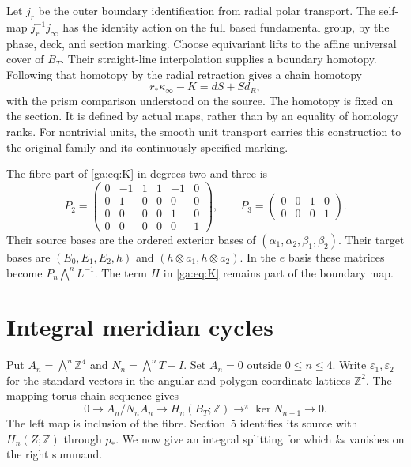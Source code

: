 Let $j_r$ be the outer boundary identification from radial polar transport.
The self-map $j_r^{-1}j_\infty$ has the identity action on the full
based fundamental group, by the phase, deck, and section marking.
Choose equivariant lifts to the affine universal cover of $B_T$.
Their straight-line interpolation supplies a boundary homotopy.
Following that homotopy by the radial retraction gives a chain homotopy
\begin{equation}\label{ga:eq:comparison}
r_*\kappa_\infty-K=dS+Sd_R,
\end{equation}
with the prism comparison understood on the source.
The homotopy is fixed on the section.
It is defined by actual maps, rather than by an equality of homology ranks.
For nontrivial units, the smooth unit transport carries this construction
to the original family and its continuously specified marking.

The fibre part of \eqref{ga:eq:K} in degrees two and three is
\begin{equation}\label{ga:eq:p23}
P_2=\begin{pmatrix}
0&-1&1&1&-1&0\\0&1&0&0&0&0\\0&0&0&0&1&0\\0&0&0&0&0&1
\end{pmatrix},\qquad
P_3=\begin{pmatrix}0&0&1&0\\0&0&0&1\end{pmatrix}.
\end{equation}
Their source bases are the ordered exterior bases of
$(\alpha_1,\alpha_2,\beta_1,\beta_2)$.
Their target bases are $(E_0,E_1,E_2,h)$ and
$(h\otimes a_1,h\otimes a_2)$.
In the $e$ basis these matrices become $P_n\bigwedge^n L^{-1}$.
The term $H$ in \eqref{ga:eq:K} remains part of the boundary map.

\section{Integral meridian cycles}

Put $A_n=\bigwedge^n\mathbb Z^4$ and $N_n=\bigwedge^nT-I$.
Set $A_n=0$ outside $0\leq n\leq4$.
Write $\varepsilon_1,\varepsilon_2$ for the standard vectors in
the angular and polygon coordinate lattices $\mathbb Z^2$.
The mapping-torus chain sequence gives
\begin{equation}\label{ga:eq:wang}
0\longrightarrow A_n/N_nA_n\longrightarrow H_n(B_T;\mathbb Z)
\mathrel{\mathop{\longrightarrow}^{\pi}}\ker N_{n-1}\longrightarrow0.
\end{equation}
The left map is inclusion of the fibre.
Section~5 identifies its source with $H_n(Z;\mathbb Z)$ through $p_*$.
We now give an integral splitting for which $k_*$ vanishes on the right summand.

